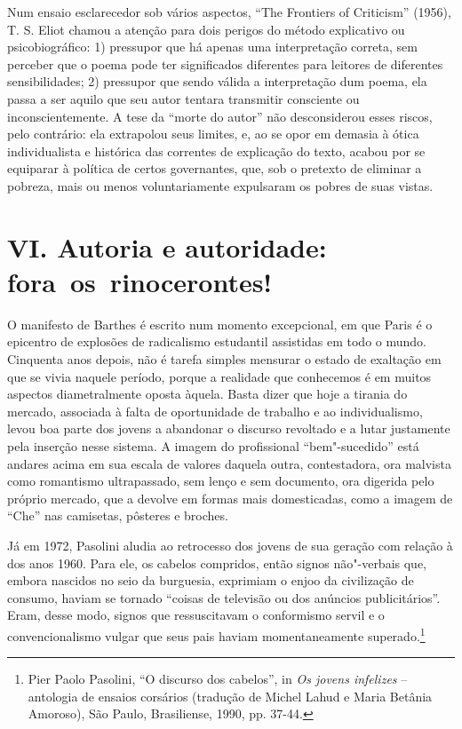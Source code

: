 Num ensaio esclarecedor sob vários aspectos, ``The Frontiers of
Criticism'' (1956), T. S. Eliot chamou a atenção para dois perigos do
método explicativo ou psicobiográfico: 1) pressupor que há apenas uma
interpretação correta, sem perceber que o poema pode ter significados
diferentes para leitores de diferentes sensibilidades; 2) pressupor que
sendo válida a interpretação dum poema, ela passa a ser aquilo que seu
autor tentara transmitir consciente ou inconscientemente. A tese da
``morte do autor'' não desconsiderou esses riscos, pelo contrário: ela
extrapolou seus limites, e, ao se opor em demasia à ótica individualista
e histórica das correntes de explicação do texto, acabou por se
equiparar à política de certos governantes, que, sob o pretexto de
eliminar a pobreza, mais ou menos voluntariamente expulsaram os pobres
de suas vistas.

\section*{VI. Autoria e autoridade: fora~os~rinocerontes!}

O manifesto de Barthes é escrito num momento excepcional, em que Paris é
o epicentro de explosões de radicalismo estudantil assistidas em todo o
mundo. Cinquenta anos depois, não é tarefa simples mensurar o estado de
exaltação em que se vivia naquele período, porque a realidade que
conhecemos é em muitos aspectos diametralmente oposta àquela. Basta
dizer que hoje a tirania do mercado, associada à falta de oportunidade
de trabalho e ao individualismo, levou boa parte dos jovens a abandonar
o discurso revoltado e a lutar justamente pela inserção nesse sistema. A
imagem do profissional ``bem"-sucedido'' está andares acima em sua escala
de valores daquela outra, contestadora, ora malvista como romantismo
ultrapassado, sem lenço e sem documento, ora digerida pelo próprio
mercado, que a devolve em formas mais domesticadas, como a imagem de
``Che'' nas camisetas, pôsteres e broches.

Já em 1972, Pasolini aludia ao retrocesso dos jovens de sua geração com
relação à dos anos 1960. Para ele, os cabelos compridos, então signos
não"-verbais que, embora nascidos no seio da burguesia, exprimiam o enjoo
da civilização de consumo, haviam se tornado ``coisas de televisão ou
dos anúncios publicitários''. Eram, desse modo, signos que ressuscitavam
o conformismo servil e o convencionalismo vulgar que seus pais haviam
momentaneamente superado.\footnote{Pier Paolo Pasolini, ``O discurso dos
  cabelos'', in \emph{Os jovens infelizes} -- antologia de ensaios
  corsários (tradução de Michel Lahud e Maria Betânia Amoroso), São
  Paulo, Brasiliense, 1990, pp. 37-44.}

